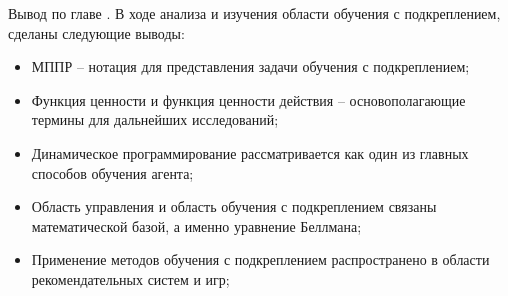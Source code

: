 



Вывод по главе \thechapter. В ходе анализа и изучения области обучения с подкреплением, сделаны следующие выводы:
\begin{itemize}

	\item МППР -- нотация для представления задачи обучения с подкреплением;
	\item Функция ценности и функция ценности действия -- основополагающие термины для дальнейших исследований; 
	\item Динамическое программирование рассматривается как один из главных способов обучения агента;
	\item Область управления и область обучения с подкреплением связаны математической базой, а именно уравнение Беллмана;
	\item Применение методов обучения с подкреплением распространено в области рекомендательных систем и игр;
\end{itemize}


%

